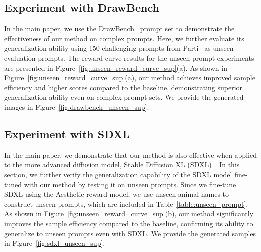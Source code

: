 \subsection{Experiment with DrawBench}
In the main paper, we use the DrawBench~\cite{imagen} prompt set to demonstrate the effectiveness of our method on complex prompts. Here, we further evaluate its generalization ability using 150 challenging prompts from Parti~\cite{parti} as unseen evaluation prompts. The reward curve results for the unseen prompt experiments are presented in Figure~\ref{fig:unseen_reward_curve_sup}(a). 
As shown in Figure~\ref{fig:unseen_reward_curve_sup}(a), our method achieves improved sample efficiency and higher scores compared to the baseline, demonstrating superior generalization ability even on complex prompt sets. We provide the generated images in Figure~\ref{fig:drawbench_unseen_sup}.


\subsection{Experiment with SDXL}
In the main paper, we demonstrate that our method is also effective when applied to the more advanced diffusion model, Stable Diffusion XL (SDXL)~\cite{sdxl}. 
In this section, we further verify the generalization capability of the SDXL model fine-tuned with our method by testing it on unseen prompts.
Since we fine-tune SDXL using the Aesthetic reward model, we use unseen animal names to construct unseen prompts, which are included in Table~\ref{table:unseen_prompt}.
As shown in Figure~\ref{fig:unseen_reward_curve_sup}(b), our method significantly improves the sample efficiency compared to the baseline, confirming its ability to generalize to unseen prompts even with SDXL.  We provide the generated samples in Figure~\ref{fig:sdxl_unseen_sup}.